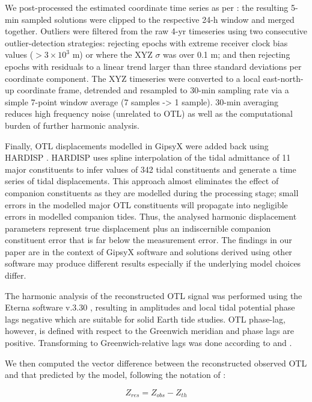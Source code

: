 \documentclass[se, manuscript]{copernicus}
\providecommand{\DIFadd}[1]{{\protect\color{blue}\uwave{#1}}} %
\providecommand{\DIFaddbegin}{} %
\providecommand{\DIFaddend}{} %
\providecommand{\DIFdelbegin}{} %
\providecommand{\DIFdelend}{} %
\begin{document}
We post-processed the estimated coordinate time series as per \cite{Penna2015}: the resulting 5-min sampled solutions were clipped to the respective 24-h window and merged together. Outliers were filtered from the raw 4-yr timeseries  using two consecutive outlier-detection strategies: rejecting epochs with extreme receiver clock bias values ($>3 \times 10^{3}$ m) or where the XYZ $\sigma$ was over 0.1 m; and then rejecting epochs with residuals to a linear trend larger than three standard deviations per coordinate component. The XYZ timeseries were converted to a local east-north-up coordinate frame, detrended and resampled to 30-min sampling rate via a simple 7-point window average (7 samples -> 1 sample). 30-min averaging reduces high frequency noise (unrelated to OTL) as well as the computational burden of further harmonic analysis.

Finally, OTL displacements modelled in GipsyX were added back using HARDISP \citep{IERS2010}. HARDISP uses spline interpolation of the tidal admittance of 11 major constituents to infer values of 342 tidal constituents and generate a time series of tidal displacements. This approach almost eliminates the effect of companion constituents \citep{Foreman1989} as they are modelled during the processing stage; small errors in the modelled major OTL constituents will propagate into negligible errors in modelled companion tides. Thus, the analysed harmonic displacement parameters represent true displacement plus an indiscernible companion constituent error that is far below the measurement error. The findings in our paper are \DIFaddbegin \DIFadd{provided }\DIFaddend in the context of GipsyX software and solutions derived using other software may produce different results especially if the underlying model choices differ.

The harmonic analysis of the reconstructed OTL signal was performed using the Eterna software v.3.30 \citep{Wenzel1996}, resulting in amplitudes and local tidal potential phase lags negative which are suitable for solid Earth tide studies. OTL phase-lag, however, is defined with respect to the Greenwich meridian and phase lags are positive. Transforming to Greenwich-relative lags was done according to \cite{Boy2003} and \cite{Bos2000}. \DIFdelbegin %

\DIFdelend We then computed the vector difference between the reconstructed observed OTL and that predicted by the model, following the notation of \cite{Yuan2013}:

\begin{equation}
Z_{res} = Z_{obs}- Z_{th}
\end{equation}
\end{document}
